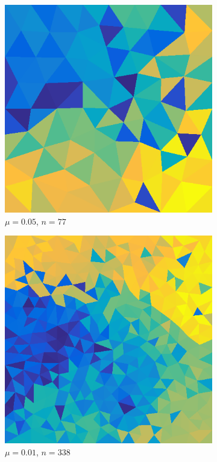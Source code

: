 \documentclass[../fem.tex]{subfile}
\begin{document}
\begin{figure}[htpb]
  \centering
  \begin{subfigure}{0.4\textwidth}
    \centering
    \includegraphics[width=0.8\linewidth]{figures/r1a/tri.png}
    \caption{$\mu=0.05$, $n=77$}
  \end{subfigure}
  \begin{subfigure}{0.4\textwidth}
    \centering
    \includegraphics[width=0.8\linewidth]{figures/r1b/tri.png}
    \caption{$\mu=0.01$, $n=338$}
  \end{subfigure}
  \begin{subfigure}{0.4\textwidth}

\end{subfigure}
\end{figure}
\end{document}
